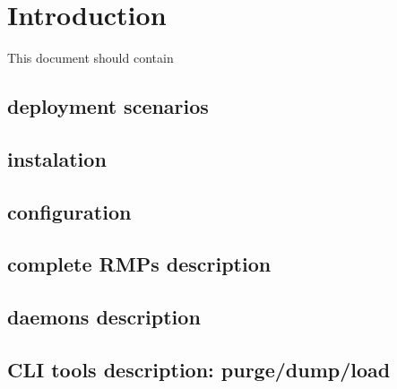 \section{Introduction}

This document should contain

\subsection{deployment scenarios}
\subsection{instalation}
\subsection{configuration}
\subsection{complete RMPs description}
\subsection{daemons description}
\subsection{CLI tools description: purge/dump/load}
